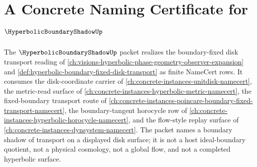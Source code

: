 \chapter{A Concrete Naming Certificate for $\HyperbolicBoundaryShadowUp$}
\label{ch:concrete-instances-hyperbolic-boundary-shadow-namecert}

The $\HyperbolicBoundaryShadowUp$ packet realizes the boundary-fixed disk
transport reading of \autoref{ch:visions-hyperbolic-phase-geometry-observer-expansion}
and \autoref{def:hyperbolic-boundary-fixed-disk-transport} as finite
NameCert rows. It consumes the disk-coordinate carrier of
\autoref{ch:concrete-instances-unitdisk-namecert}, the metric-read surface of
\autoref{ch:concrete-instances-hyperbolic-metric-namecert}, the fixed-boundary
transport route of \autoref{ch:concrete-instances-poincare-boundary-fixed-transport-namecert},
the boundary-tangent horocycle row of
\autoref{ch:concrete-instances-hyperbolic-horocycle-namecert}, and the
flow-style replay surface of \autoref{ch:concrete-instances-dynsystem-namecert}.
The packet names a boundary shadow of transport on a displayed disk surface;
it is not a host ideal-boundary quotient, not a physical cosmology, not a
global flow, and not a completed hyperbolic surface.



